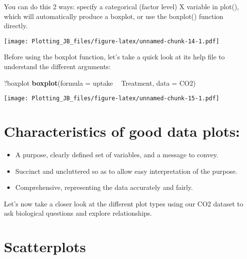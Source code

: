 \documentclass[]{article}
\newenvironment{Shaded}{\begin{snugshade}}{\end{snugshade}}
\newcommand{\DataTypeTok}[1]{\textcolor[rgb]{0.13,0.29,0.53}{#1}}
\newcommand{\KeywordTok}[1]{\textcolor[rgb]{0.13,0.29,0.53}{\textbf{#1}}}
\newcommand{\NormalTok}[1]{#1}
\newcommand{\OperatorTok}[1]{\textcolor[rgb]{0.81,0.36,0.00}{\textbf{#1}}}
\newcommand{\StringTok}[1]{\textcolor[rgb]{0.31,0.60,0.02}{#1}}
\providecommand{\tightlist}{%
  \setlength{\itemsep}{0pt}\setlength{\parskip}{0pt}}
\begin{document}
You can do this 2 ways: specify a categorical (factor level) X variable
in plot(), which will automatically produce a boxplot, or use the
boxplot() function directly.

\begin{Shaded}
\end{Shaded}

\texttt{[image: Plotting\_JB\_files/figure-latex/unnamed-chunk-14-1.pdf]}

Before using the boxplot function, let's take a quick look at its help
file to understand the different arguments:

\begin{Shaded}
\begin{Highlighting}[]
\NormalTok{?boxplot}
\KeywordTok{boxplot}\NormalTok{(}\DataTypeTok{formula =}\NormalTok{ uptake }\OperatorTok{~}\StringTok{ }\NormalTok{Treatment, }
        \DataTypeTok{data =}\NormalTok{ CO2)}
\end{Highlighting}
\end{Shaded}

\texttt{[image: Plotting\_JB\_files/figure-latex/unnamed-chunk-15-1.pdf]}

\hypertarget{characteristics-of-good-data-plots}{%
\section{Characteristics of good data
plots:}\label{characteristics-of-good-data-plots}}

\begin{itemize}
\tightlist
\item
  A purpose, clearly defined set of variables, and a message to convey.
\item
  Succinct and uncluttered so as to allow easy interpretation of the
  purpose.
\item
  Comprehensive, representing the data accurately and fairly.
\end{itemize}

Let's now take a closer look at the different plot types using our CO2
dataset to ask biological questions and explore relationships.

\hypertarget{scatterplots}{%
\section{Scatterplots}\label{scatterplots}}
\end{document}
